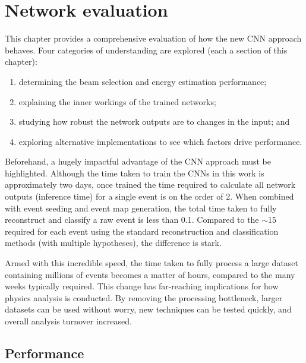 \chapter{Network evaluation} %
\label{chap:results} %

This chapter provides a comprehensive evaluation of how the new CNN approach behaves. Four
categories of understanding are explored (each a section of this chapter):
\begin{enumerate}
    \item determining the beam selection and energy estimation performance;
    \item explaining the inner workings of the trained networks;
    \item studying how robust the network outputs are to changes in the input; and
    \item exploring alternative implementations to see which factors drive performance.
\end{enumerate}

Beforehand, a hugely impactful advantage of the CNN approach must be highlighted. Although the
time taken to train the CNNs in this work is approximately two days, once trained the time
required to calculate all network outputs (inference time) for a single event is on the order of
\SI{2}{}. When combined with event seeding and event map generation, the total time taken
to fully reconstruct and classify a raw event is less than \SI{0.1}{}. Compared to
the $\sim$\SI{15}{} required for each event using the standard reconstruction and
classification methods (with multiple hypotheses), the difference is stark.

Armed with this incredible speed, the time taken to fully process a large dataset containing
millions of events becomes a matter of hours, compared to the many weeks typically required. This
change has far-reaching implications for how physics analysis is conducted. By removing the
processing bottleneck, larger datasets can be used without worry, new techniques can be tested
quickly, and overall analysis turnover increased.

\section{Performance} %
\label{sec:results_eval} %

